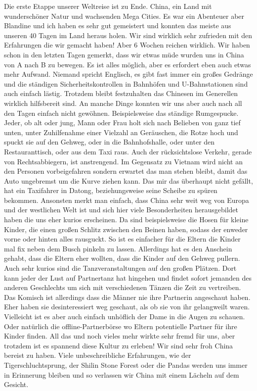 \documentclass[11pt]{book}
\begin{document}
Die erste Etappe unserer Weltreise ist zu Ende. China, ein Land mit wunderschöner Natur und wachsenden Mega Cities.
Es war ein Abenteuer aber Blandine und ich haben es sehr gut gemeistert und konnten das meiste aus unseren 40 
Tagen im Land heraus holen. Wir sind wirklich sehr zufrieden mit den Erfahrungen die wir gemacht haben! Aber 6 
Wochen reichen wirklich. Wir haben schon in den letzten Tagen gemerkt, dass wir etwas müde wurden uns in China 
von A nach B zu bewegen. Es ist alles möglich, aber es erfordert eben auch etwas mehr Aufwand. Niemand spricht 
Englisch, es gibt fast immer ein großes Gedränge und die ständigen Sicherheitskontrollen in Bahnhöfen und U-Bahnstationen
sind auch einfach lästig. Trotzdem bleibt festzuhalten das Chinesen im Generellen wirklich hilfsbereit sind. An manche 
Dinge konnten wir uns aber auch nach all den Tagen einfach nicht gewöhnen. Beispielsweise das ständige Rumgespucke.
Jeder, ob alt oder jung, Mann oder Frau holt sich nach Belieben von ganz tief unten, unter Zuhilfenahme einer Vielzahl 
an Geräuschen, die Rotze hoch und spuckt sie auf den Gehweg, oder in die Bahnhofshalle, oder unter den Restauranttisch, 
oder aus dem Taxi raus. Auch der rücksichtslose Verkehr, gerade von Rechtsabbiegern, ist anstrengend. Im Gegensatz zu 
Vietnam wird nicht an den Personen vorbeigefahren sondern erwartet das man stehen bleibt, damit das Auto ungebremst 
um die Kurve ziehen kann. Das mir das überhaupt nicht gefällt, hat ein Taxifahrer in Datong, beziehungsweise seine 
Scheibe zu spüren bekommen. Ansonsten merkt man einfach, dass China sehr weit weg von Europa und der westlichen Welt 
ist und sich hier viele Besonderheiten herausgebildet haben die uns eher kurios erscheinen. Da sind beispielsweise 
die Hosen für kleine Kinder, die einen großen Schlitz zwischen den Beinen haben, sodass der enweder vorne oder hinten 
alles rausguckt. So ist es einfacher für die Eltern die Kinder mal fix neben dem Busch pinkeln zu lassen. Allerdings 
hat es den Anschein gehabt, dass die Eltern eher wollten, dass die Kinder auf den Gehweg pullern. Auch sehr kurios 
sind die Tanzveranstaltungen auf den großen Plätzen. Dort kann jeder der Lust auf Partnertanz hat hingehen und findet 
sofort jemanden des anderen Geschlechts um sich mit verschiedenen Tänzen die Zeit zu vertreiben. Das Komisch ist allerdings 
dass die Männer nie ihre Partnerin angeschaut haben. Eher haben sie desinteressiert weg geschaut, als ob sie von ihr 
gelangweilt waren. Vielleicht ist es aber auch einfach unhöflich der Dame in die Augen zu schauen. Oder natürlich 
die offline-Partnerbörse wo Eltern potentielle Partner für ihre Kinder finden. All das und noch vieles mehr wirkte 
sehr fremd für uns, aber trotzdem ist es spannend diese Kultur zu erleben!
Wir sind sehr froh China bereist zu haben. Viele unbeschreibliche Erfahrungen, wie der Tigerschluchtsprung, 
der Shilin Stone Forest oder die Pandas werden uns immer in Erinnerung bleiben und so verlassen wir China mit 
einem Lächeln auf dem Gesicht.
\end{document}
